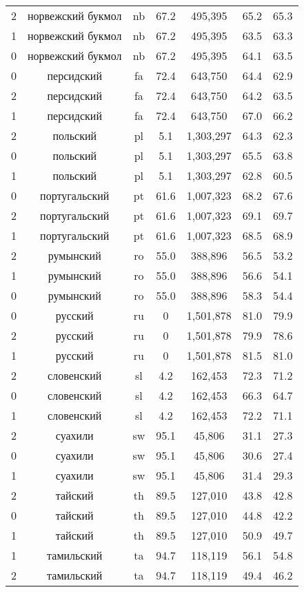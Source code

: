 \begin{table*}
{\begin{tabular}{|c|c|c|c||c|c|c|}
2 & норвежский букмол & nb & 67.2 & 495,395 & 65.2 & 65.3\\
1 & норвежский букмол & nb & 67.2 & 495,395 & 63.5 & 63.3\\
0 & норвежский букмол & nb & 67.2 & 495,395 & 64.1 & 63.5\\
0 & персидский & fa & 72.4 & 643,750 & 64.4 & 62.9\\
2 & персидский & fa & 72.4 & 643,750 & 64.2 & 63.5\\
1 & персидский & fa & 72.4 & 643,750 & 67.0 & 66.2\\
2 & польский & pl & 5.1 & 1,303,297 & 64.3 & 62.3\\
0 & польский & pl & 5.1 & 1,303,297 & 65.5 & 63.8\\
1 & польский & pl & 5.1 & 1,303,297 & 62.8 & 60.5\\
0 & португальский & pt & 61.6 & 1,007,323 & 68.2 & 67.6\\
2 & португальский & pt & 61.6 & 1,007,323 & 69.1 & 69.7\\
1 & португальский & pt & 61.6 & 1,007,323 & 68.5 & 68.9\\
2 & румынский & ro & 55.0 & 388,896 & 56.5 & 53.2\\
1 & румынский & ro & 55.0 & 388,896 & 56.6 & 54.1\\
0 & румынский & ro & 55.0 & 388,896 & 58.3 & 54.4\\
0 & русский & ru & 0 & 1,501,878 & 81.0 & 79.9\\
2 & русский & ru & 0 & 1,501,878 & 79.9 & 78.6\\
1 & русский & ru & 0 & 1,501,878 & 81.5 & 81.0\\
2 & словенский & sl & 4.2 & 162,453 & 72.3 & 71.2\\
0 & словенский & sl & 4.2 & 162,453 & 66.3 & 64.7\\
1 & словенский & sl & 4.2 & 162,453 & 72.2 & 71.1\\
2 & суахили & sw & 95.1 & 45,806 & 31.1 & 27.3\\
0 & суахили & sw & 95.1 & 45,806 & 30.6 & 27.4\\
1 & суахили & sw & 95.1 & 45,806 & 31.4 & 29.3\\
2 & тайский & th & 89.5 & 127,010 & 43.8 & 42.8\\
0 & тайский & th & 89.5 & 127,010 & 44.8 & 42.2\\
1 & тайский & th & 89.5 & 127,010 & 50.9 & 49.7\\
1 & тамильский & ta & 94.7 & 118,119 & 56.1 & 54.8\\
2 & тамильский & ta & 94.7 & 118,119 & 49.4 & 46.2\\

\end{tabular}}
\end{table*}
